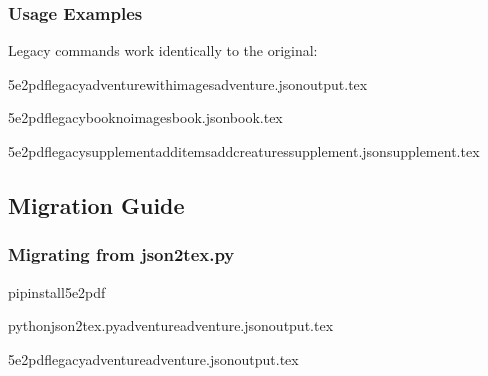 \documentclass[letterpaper,10pt,english]{sphinxmanual}
\begin{document}
\subsubsection{Usage Examples}
\label{\detokenize{developer/legacy:usage-examples}}
\sphinxAtStartPar
Legacy commands work identically to the original:

\begin{sphinxVerbatim}[commandchars=\\\{\}]
5e2pdflegacy\PYGZhy{}\PYGZhy{}adventure\PYGZhy{}\PYGZhy{}with\PYGZhy{}imagesadventure.json\PYGZgt{}output.tex

5e2pdflegacy\PYGZhy{}\PYGZhy{}book\PYGZhy{}\PYGZhy{}no\PYGZhy{}imagesbook.json\PYGZgt{}book.tex

5e2pdflegacy\PYGZhy{}\PYGZhy{}supplement\PYGZhy{}\PYGZhy{}add\PYGZhy{}items\PYGZhy{}\PYGZhy{}add\PYGZhy{}creaturessupplement.json\PYGZgt{}supplement.tex
\end{sphinxVerbatim}


\subsection{Migration Guide}
\label{\detokenize{developer/legacy:migration-guide}}

\subsubsection{Migrating from json2tex.py}
\label{\detokenize{developer/legacy:migrating-from-json2tex-py}}
\sphinxAtStartPar
{}

\begin{sphinxVerbatim}[commandchars=\\\{\}]
pipinstall5e2pdf
\end{sphinxVerbatim}

\sphinxAtStartPar
{}

\begin{sphinxVerbatim}[commandchars=\\\{\}]
pythonjson2tex.py\PYGZhy{}\PYGZhy{}adventureadventure.json\PYGZgt{}output.tex

5e2pdflegacy\PYGZhy{}\PYGZhy{}adventureadventure.json\PYGZgt{}output.tex
\end{sphinxVerbatim}
\end{document}
